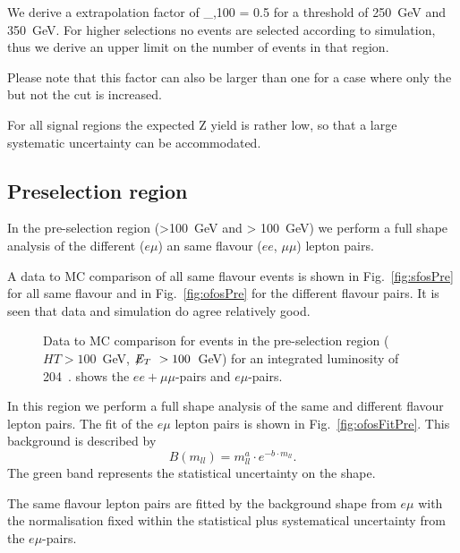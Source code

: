 We derive a extrapolation factor of
\be
    \epsilon_{\MET,100 } = 0.5 
\ee
for a \HT threshold of 250~GeV and 350~GeV.
For higher \MET selections no events are
selected according to simulation, 
thus we derive an upper limit on the number 
of events in that region.

Please note that this factor can also be
larger than one for a case where only
the \HT but not the \MET cut is
increased.

For all signal regions the expected Z yield
is rather low, so that a large systematic uncertainty
can be accommodated.

\subsection{Preselection region}

In the pre-selection region (\HT>100~GeV and \MET > 100~GeV)
we perform a full shape analysis of the different ($e\mu$) an same flavour ($ee$, $\mu\mu$)
lepton pairs.

A data to MC comparison of all same flavour events
is shown in Fig.~\ref{fig:sfosPre} for all same flavour
and in Fig.~\ref{fig:ofosPre} for the different flavour
pairs. It is seen that data and simulation do agree relatively good.

\begin{figure}[hbtp]
  \hfill
  \hfill
  \caption{Data to MC comparison for events in the pre-selection region ($HT>100$~GeV, $\displaystyle{\not} E_T~> 100$~GeV)
  for an integrated luminosity of 204~\pbi.  shows the $ee+\mu\mu$-pairs and
  $e\mu$-pairs.}
\end{figure}

In this region we perform a full shape analysis
of the same and different flavour lepton pairs.
The fit of the $e\mu$ lepton pairs is shown
in Fig.~\ref{fig:ofosFitPre}.
This background is described by 
\begin{equation}\label{eq:fit_bkg}
B(m_{ll}) = m_{ll}^{a} \cdot e^{-b\cdot m_{ll}}.
\end{equation}
The green band represents the statistical 
uncertainty on the shape.

The same flavour lepton pairs are fitted
by the background shape from $e\mu$
with the normalisation fixed within the 
statistical plus systematical uncertainty
from the $e\mu$-pairs.

